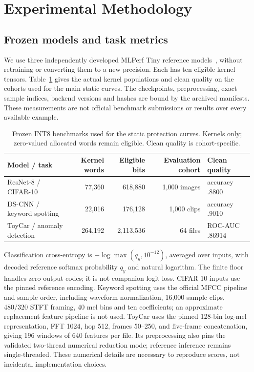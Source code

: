 \section{Experimental Methodology}
\label{sec:methods}
\subsection{Frozen models and task metrics}
We use three independently developed MLPerf Tiny reference models~\cite{banbury2021mlperf,mlcommons2026tiny}, without retraining or converting them to a new precision. Each has ten eligible kernel tensors. Table~\ref{tab:models} gives the actual kernel populations and clean quality on the cohorts used for the main static curves. The checkpoints, preprocessing, exact sample indices, backend versions and hashes are bound by the archived manifests. These measurements are not official benchmark submissions or results over every available example.

\begin{table}[t]
\caption{Frozen INT8 benchmarks used for the static protection curves. Kernels only; zero-valued allocated words remain eligible. Clean quality is cohort-specific.}
\label{tab:models}\centering\small
\begin{tabular}{lrrrl}
\toprule
Model / task & Kernel words & Eligible bits & Evaluation cohort & Clean quality\\
\midrule
ResNet-8 / CIFAR-10 & 77,360 & 618,880 & 1,000 images & accuracy .8800\\
DS-CNN / keyword spotting & 22,016 & 176,128 & 1,000 clips & accuracy .9010\\
ToyCar / anomaly detection & 264,192 & 2,113,536 & 64 files & ROC-AUC .86914\\
\bottomrule
\end{tabular}
\end{table}

Classification cross-entropy is $-\log\max(q_y,10^{-12})$, averaged over
inputs, with decoded reference softmax probability $q_y$ and natural logarithm.
The finite floor handles zero output codes; it is not companion-logit loss.
CIFAR-10 inputs use the pinned reference encoding. Keyword spotting uses the
official MFCC pipeline and sample order, including waveform normalization,
16,000-sample clips, 480/320 STFT framing, 40 mel bins and ten coefficients;
an approximate replacement feature pipeline is not used. ToyCar uses the pinned
128-bin log-mel representation, FFT 1024, hop 512, frames 50--250, and five-frame
concatenation, giving 196 windows of 640 features per file. Its preprocessing
also pins the validated two-thread numerical reduction mode; reference inference
remains single-threaded. These numerical details are necessary to reproduce
scores, not incidental implementation choices.

